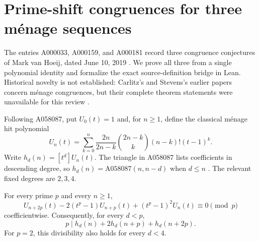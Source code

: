 \section{Prime-shift congruences for three m\'enage sequences}
\label{sec:menage}

The entries A000033, A000159, and A000181 record three congruence conjectures
of Mark van Hoeij, dated June 10, 2019 \cite{A000033,A000159,A000181}.
We prove all three from a single polynomial identity and formalize the exact
source-definition bridge in Lean. Historical novelty is not established:
Carlitz's and Stevens's earlier papers concern m\'enage congruences, but their
complete theorem statements were unavailable for this review
\cite{Carlitz1952,Carlitz1954,Stevens1981}.

Following A058087, put $U_0(t)=1$ and, for $n\geq1$, define the classical
m\'enage hit polynomial
\begin{equation}\label{eq:menage-source}
 U_n(t)=\sum_{k=0}^{n}\frac{2n}{2n-k}
       \binom{2n-k}{k}(n-k)!(t-1)^k.
\end{equation}
Write $h_d(n)=[t^d]U_n(t)$. The triangle in A058087 lists coefficients in
descending degree, so $h_d(n)=\mathrm{A058087}(n,n-d)$ when $d\leq n$
\cite{A058087}. The relevant fixed degrees are $2,3,4$.

\begin{theorem}\label{thm:menage-shift}
For every prime $p$ and every $n\geq1$,
\begin{equation}\label{eq:menage-shift}
 U_{n+2p}(t)-2(t^p-1)U_{n+p}(t)+(t^p-1)^2U_n(t)
 \equiv0\pmod p
\end{equation}
coefficientwise. Consequently, for every $d<p$,
\[
 p\mid h_d(n)+2h_d(n+p)+h_d(n+2p).
\]
For $p=2$, this divisibility also holds for every $d<4$.
\end{theorem}

